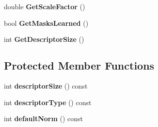 \begin{DoxyCompactItemize}
\item 
double {\bfseries Get\+Scale\+Factor} ()\hypertarget{classmdBRIEFextractor1_a5f35126b7400d7bee0e2f985ddcb8efe}{}\label{classmdBRIEFextractor1_a5f35126b7400d7bee0e2f985ddcb8efe}

\item 
bool {\bfseries Get\+Masks\+Learned} ()\hypertarget{classmdBRIEFextractor1_aad00a30f095078c45a3f9f53c4c172ee}{}\label{classmdBRIEFextractor1_aad00a30f095078c45a3f9f53c4c172ee}

\item 
int {\bfseries Get\+Descriptor\+Size} ()\hypertarget{classmdBRIEFextractor1_aadcb14bcbb38f66deb2f74fd7f53c1ba}{}\label{classmdBRIEFextractor1_aadcb14bcbb38f66deb2f74fd7f53c1ba}

\end{DoxyCompactItemize}
\subsection*{Protected Member Functions}
\begin{DoxyCompactItemize}
\item 
int {\bfseries descriptor\+Size} () const \hypertarget{classmdBRIEFextractor1_a1bc510192ddb4a0ea8e4a31a3fa15676}{}\label{classmdBRIEFextractor1_a1bc510192ddb4a0ea8e4a31a3fa15676}

\item 
int {\bfseries descriptor\+Type} () const \hypertarget{classmdBRIEFextractor1_a50ce882363a537bb56ffcc7ad002b01b}{}\label{classmdBRIEFextractor1_a50ce882363a537bb56ffcc7ad002b01b}

\item 
int {\bfseries default\+Norm} () const \hypertarget{classmdBRIEFextractor1_ad1bad790d5775354793982e9146fb6f7}{}\label{classmdBRIEFextractor1_ad1bad790d5775354793982e9146fb6f7}

\end{DoxyCompactItemize}
